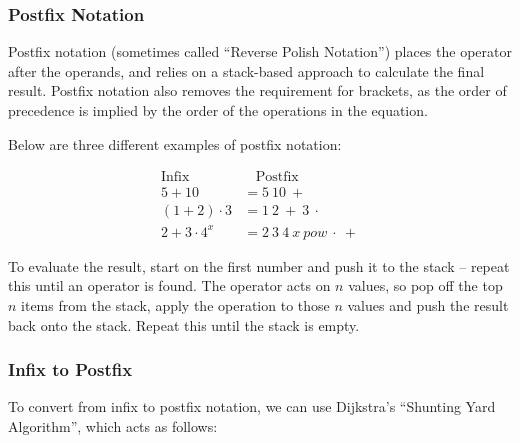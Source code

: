 \documentclass[12pt]{article}
\begin{document}
\subsubsection{Postfix Notation}

Postfix notation (sometimes called ``Reverse Polish Notation'') places the operator after the operands, and relies on a stack-based approach to calculate the final result. Postfix notation also removes the requirement for brackets, as the order of precedence is implied by the order of the operations in the equation.

Below are three different examples of postfix notation:

\begin{equation}
\begin{split}
\text{Infix} \ & \ \ \ \ \text{Postfix} \\
5+10&=5 \ 10 \ + \\
\left( 1+2 \right) \cdot 3&=1 \ 2 \ + \ 3 \ \cdot \\
2 + 3 \cdot 4 ^ x&=2 \ 3 \ 4 \ x \ \textit{pow} \ \cdot \ +
\end{split}
\end{equation}

To evaluate the result, start on the first number and push it to the stack -- repeat this until an operator is found. The operator acts on $n$ values, so pop off the top $n$ items from the stack, apply the operation to those $n$ values and push the result back onto the stack. Repeat this until the stack is empty.

\subsubsection{Infix to Postfix}

To convert from infix to postfix notation, we can use Dijkstra's ``Shunting Yard Algorithm''\cite{shuntingyard}, which acts as follows:
\end{document}
